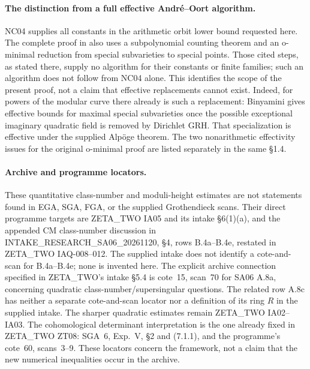 \documentclass[11pt]{article}
\theoremstyle{remark}
\begin{document}
\paragraph{The distinction from a full effective Andr\'e--Oort algorithm.}
NC04 supplies all constants in the arithmetic orbit lower bound requested
here.  The complete proof in \cite[\S6.3, Theorem~6.1, and \S6.5,
p.~388]{NC-Tsimerman2018} also uses a subpolynomial counting theorem and
an o-minimal reduction from special subvarieties to special points.
Those cited steps, as stated there, supply no algorithm for their
constants or finite families; such an algorithm does not follow from
NC04 alone.  This identifies the scope of the present proof, not a
claim that effective replacements cannot exist.  Indeed, for powers
of the modular curve there already is such a replacement:
Binyamini \cite[\S1.2, Theorem~1, preprint p.~2; \S1.4, pp.~3--4]
{NC-Binyamini2020} gives effective bounds for maximal special
subvarieties once the possible exceptional imaginary quadratic field
is removed by Dirichlet GRH.  That specialization is effective under
the supplied Alp\"oge theorem.  The two nonarithmetic effectivity
issues for the original o-minimal proof are listed separately in the
same \S1.4.

\paragraph{Archive and programme locators.}
These quantitative class-number and moduli-height estimates are not
statements found in EGA, SGA, FGA, or the supplied Grothendieck scans.
Their direct programme targets are ZETA\_TWO IA05 and its intake
\S6(1)(a), and the appended CM class-number discussion in
INTAKE\_RESEARCH\_SA06\_20261120, \S4, rows B.4a--B.4e, restated
in ZETA\_TWO IAQ-008--012.  The supplied intake does not identify a
cote-and-scan for B.4a--B.4e; none is invented here.  The explicit
archive connection specified in ZETA\_TWO's intake \S5.4 is
cote~15, scan~70 for SA06 A.8a, concerning quadratic
class-number/supersingular questions.  The related row A.8c has
neither a separate cote-and-scan locator nor a definition of its
ring $R$ in the supplied intake.  The sharper quadratic estimates
remain ZETA\_TWO IA02--IA03.
The cohomological determinant interpretation is the one already fixed
in ZETA\_TWO ZT08: SGA~6, Exp.~V, \S2 and (7.1.1), and the programme's
cote~60, scans~3--9.  These locators concern the framework, not a
claim that the new numerical inequalities occur in the archive.
\end{document}

